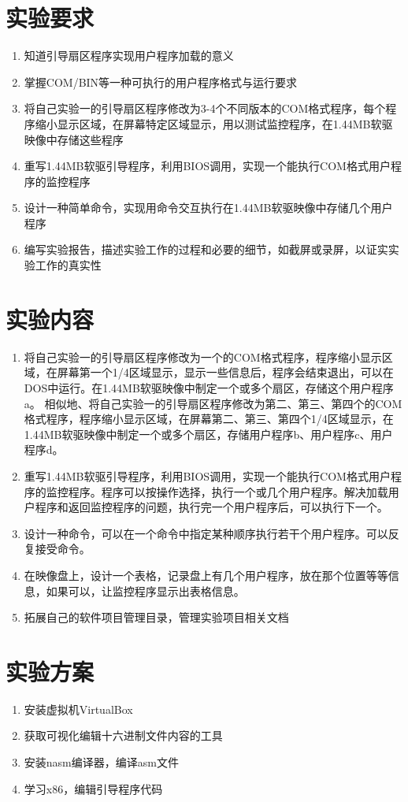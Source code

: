\documentclass[12pt]{article}
\begin{document}
\section{\LARGE 实验要求}
\begin{enumerate}
\item 知道引导扇区程序实现用户程序加载的意义
\item 掌握COM/BIN等一种可执行的用户程序格式与运行要求
\item 将自己实验一的引导扇区程序修改为3-4个不同版本的COM格式程序，每个程序缩小显示区域，在屏幕特定区域显示，用以测试监控程序，在1.44MB软驱映像中存储这些程序
\item 重写1.44MB软驱引导程序，利用BIOS调用，实现一个能执行COM格式用户程序的监控程序
\item 设计一种简单命令，实现用命令交互执行在1.44MB软驱映像中存储几个用户程序
\item 编写实验报告，描述实验工作的过程和必要的细节，如截屏或录屏，以证实实验工作的真实性
\end{enumerate}


\section{\LARGE 实验内容}
\begin{enumerate}
\item 将自己实验一的引导扇区程序修改为一个的COM格式程序，程序缩小显示区域，在屏幕第一个1/4区域显示，显示一些信息后，程序会结束退出，可以在DOS中运行。在1.44MB软驱映像中制定一个或多个扇区，存储这个用户程序a。
相似地、将自己实验一的引导扇区程序修改为第二、第三、第四个的COM格式程序，程序缩小显示区域，在屏幕第二、第三、第四个1/4区域显示，在1.44MB软驱映像中制定一个或多个扇区，存储用户程序b、用户程序c、用户程序d。
\item 重写1.44MB软驱引导程序，利用BIOS调用，实现一个能执行COM格式用户程序的监控程序。程序可以按操作选择，执行一个或几个用户程序。解决加载用户程序和返回监控程序的问题，执行完一个用户程序后，可以执行下一个。
\item 设计一种命令，可以在一个命令中指定某种顺序执行若干个用户程序。可以反复接受命令。
\item 在映像盘上，设计一个表格，记录盘上有几个用户程序，放在那个位置等等信息，如果可以，让监控程序显示出表格信息。
\item 拓展自己的软件项目管理目录，管理实验项目相关文档
\end{enumerate}


\section{\LARGE 实验方案}
\begin{enumerate}
\item 安装虚拟机VirtualBox
\item 获取可视化编辑十六进制文件内容的工具
\item 安装nasm编译器，编译asm文件
\item 学习x86，编辑引导程序代码
\end{enumerate}
\end{document}
